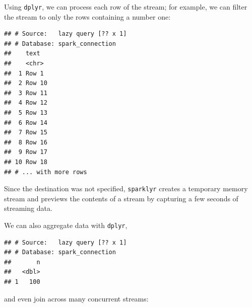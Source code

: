 \documentclass[]{book}
\newenvironment{Shaded}{\begin{snugshade}}{\end{snugshade}}
\newcommand{\DataTypeTok}[1]{\textcolor[rgb]{0.13,0.29,0.53}{#1}}
\newcommand{\KeywordTok}[1]{\textcolor[rgb]{0.13,0.29,0.53}{\textbf{#1}}}
\newcommand{\NormalTok}[1]{#1}
\newcommand{\OperatorTok}[1]{\textcolor[rgb]{0.81,0.36,0.00}{\textbf{#1}}}
\newcommand{\OtherTok}[1]{\textcolor[rgb]{0.56,0.35,0.01}{#1}}
\newcommand{\StringTok}[1]{\textcolor[rgb]{0.31,0.60,0.02}{#1}}
\theoremstyle{definition}
\theoremstyle{definition}
\theoremstyle{definition}
\theoremstyle{remark}
\begin{document}
Using \texttt{dplyr}, we can process each row of the stream; for
example, we can filter the stream to only the rows containing a number
one:

\begin{Shaded}
\end{Shaded}

\begin{verbatim}
## # Source:   lazy query [?? x 1]
## # Database: spark_connection
##    text  
##    <chr> 
##  1 Row 1 
##  2 Row 10
##  3 Row 11
##  4 Row 12
##  5 Row 13
##  6 Row 14
##  7 Row 15
##  8 Row 16
##  9 Row 17
## 10 Row 18
## # ... with more rows
\end{verbatim}

Since the destination was not specified, \texttt{sparklyr} creates a
temporary memory stream and previews the contents of a stream by
capturing a few seconds of streaming data.

We can also aggregate data with \texttt{dplyr},

\begin{Shaded}
\end{Shaded}

\begin{verbatim}
## # Source:   lazy query [?? x 1]
## # Database: spark_connection
##       n
##   <dbl>
## 1   100
\end{verbatim}

and even join across many concurrent streams:

\begin{Shaded}
\end{Shaded}
\end{document}

